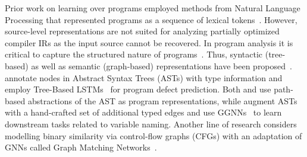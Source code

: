 Prior work on learning over programs employed methods from Natural Language
Processing that represented programs as a sequence of lexical
tokens~\citep{Allamanis2016d,Cummins2020}. However, source-level representations
are not suited for analyzing partially optimized compiler IRs as the input
source cannot be recovered. In program analysis it is critical to capture the
structured nature of programs~\citep{Raychev2015,Allamanis2017b,Alon2018c}.
Thus, syntactic (tree-based) as well as semantic (graph-based) representations
have been proposed~\citep{Allamanis2017a,Brauckmann2020}. \citet{Dam2018}
annotate nodes in Abstract Syntax Trees (ASTs) with type information and employ
Tree-Based LSTMs~\citep{Tai2015a} for program defect prediction. Both
\citet{Raychev2015} and \citet{Alon2018a,Alon2018c} use path-based abstractions
of the AST as program representations, while \citet{Allamanis2017b} augment ASTs
with a hand-crafted set of additional typed edges and use GGNNs~\citep{Li2015a}
to learn downstream tasks related to variable naming. Another line of research
considers modelling binary similarity via control-flow graphs (CFGs) with an
adaptation of GNNs called Graph Matching Networks~\citep{Li2019}.

